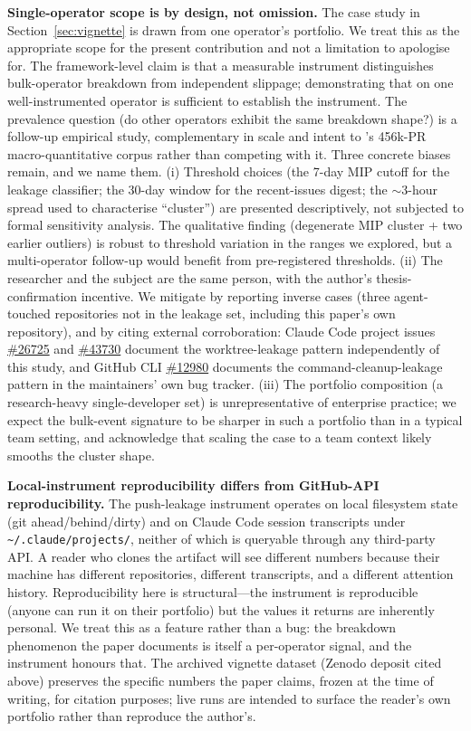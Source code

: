 \documentclass[sigconf, nonacm, anonymous=false]{acmart}
\begin{document}
\textbf{Single-operator scope is by design, not omission.} The case study in Section~\ref{sec:vignette} is drawn from one operator's portfolio. We treat this as the appropriate scope for the present contribution and not a limitation to apologise for. The framework-level claim is that a measurable instrument distinguishes bulk-operator breakdown from independent slippage; demonstrating that on one well-instrumented operator is sufficient to establish the instrument. The prevalence question (do other operators exhibit the same breakdown shape?) is a follow-up empirical study, complementary in scale and intent to \citet{li2025rise}'s 456k-PR macro-quantitative corpus rather than competing with it. Three concrete biases remain, and we name them. (i) Threshold choices (the 7-day MIP cutoff for the leakage classifier; the 30-day window for the recent-issues digest; the $\sim$3-hour spread used to characterise ``cluster'') are presented descriptively, not subjected to formal sensitivity analysis. The qualitative finding (degenerate MIP cluster + two earlier outliers) is robust to threshold variation in the ranges we explored, but a multi-operator follow-up would benefit from pre-registered thresholds. (ii) The researcher and the subject are the same person, with the author's thesis-confirmation incentive. We mitigate by reporting inverse cases (three agent-touched repositories not in the leakage set, including this paper's own repository), and by citing external corroboration: Claude Code project issues \href{https://github.com/anthropics/claude-code/issues/26725}{\#26725} and \href{https://github.com/anthropics/claude-code/issues/43730}{\#43730} document the worktree-leakage pattern independently of this study, and GitHub CLI \href{https://github.com/cli/cli/issues/12980}{\#12980} documents the command-cleanup-leakage pattern in the maintainers' own bug tracker. (iii) The portfolio composition (a research-heavy single-developer set) is unrepresentative of enterprise practice; we expect the bulk-event signature to be sharper in such a portfolio than in a typical team setting, and acknowledge that scaling the case to a team context likely smooths the cluster shape.

\textbf{Local-instrument reproducibility differs from GitHub-API reproducibility.} The push-leakage instrument operates on local filesystem state (git ahead/behind/dirty) and on Claude Code session transcripts under \texttt{\textasciitilde/.claude/projects/}, neither of which is queryable through any third-party API. A reader who clones the artifact will see different numbers because their machine has different repositories, different transcripts, and a different attention history. Reproducibility here is structural---the instrument is reproducible (anyone can run it on their portfolio) but the values it returns are inherently personal. We treat this as a feature rather than a bug: the breakdown phenomenon the paper documents is itself a per-operator signal, and the instrument honours that. The archived vignette dataset (Zenodo deposit cited above) preserves the specific numbers the paper claims, frozen at the time of writing, for citation purposes; live runs are intended to surface the reader's own portfolio rather than reproduce the author's.
\end{document}
